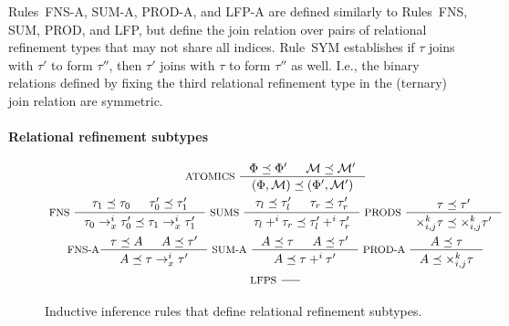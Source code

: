 Rules~FNS-A, SUM-A, PROD-A, and LFP-A are defined similarly to
Rules~FNS, SUM, PROD, and LFP, but define the join relation over pairs
of relational refinement types that may not share all indices.
%
Rule~SYM establishes if $\tau$ joins with $\tau'$ to form $\tau''$,
then $\tau'$ joins with $\tau$ to form $\tau''$ as well.
%
I.e., the binary relations defined by fixing the third relational
refinement type in the (ternary) join relation are symmetric.

\paragraph{Relational refinement subtypes}
%
\begin{figure}
  \centering
  \begin{gather*}
    \inference[ ATOMICS ]{
      \Phi \subtype \Phi' & \mathcal{M} \subtype \mathcal{M}' }{
      (\Phi, \mathcal{M}) \subtype (\Phi', \mathcal{M}') } \\
    \inference[ FNS ]{
      \tau_1 \subtype \tau_0 &
      \tau_0' \subtype \tau_1' }{
      \tau_0 \to_x^i \tau_0' \subtype \tau_1 \to_x^i \tau_1' } 
    \inference[ SUMS ]{
      \tau_l \subtype \tau_l' & \tau_r \subtype \tau_r' }{
      \tau_l +^i \tau_r \subtype \tau_l' +^i \tau_r' } 
    \inference[ PRODS ]{ \tau \subtype \tau'}{
      \times_{i, j}^k \tau \subtype \times_{i, j}^k \tau'} \\
    \inference[ FNS-A]{ \tau \subtype A & A \subtype \tau' }{
      A \subtype \tau \rightarrow_x^i \tau'} 
    \inference[ SUM-A ]{ A \subtype \tau & A \subtype \tau' }{
      A \subtype \tau +^i \tau' } 
    \inference[ PROD-A ]{ A \subtype \tau }{
      A \subtype \times^k_{i, j} \tau } \\
    \inference[ LFPS ]{}{} 
  \end{gather*}
  \caption{Inductive inference rules that define relational refinement
    subtypes.
  }
  \label{fig:subtypes}
\end{figure}

